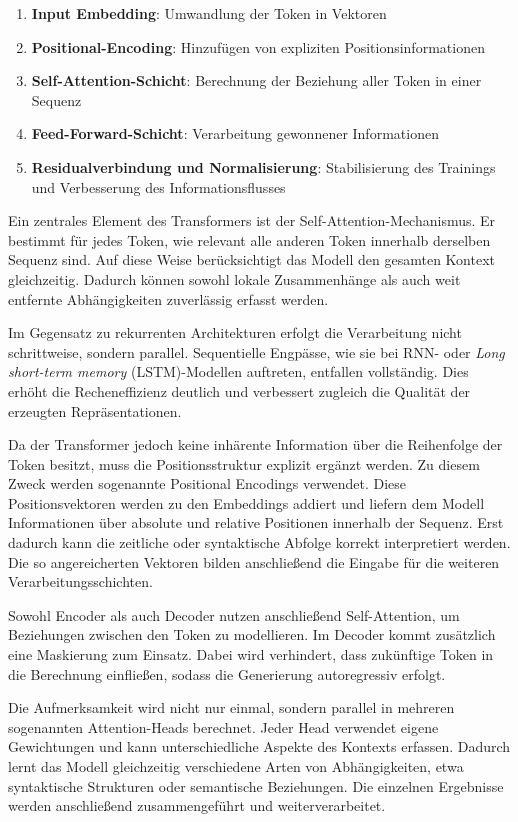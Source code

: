 \begin{enumerate}
    \item \textbf{Input Embedding}: Umwandlung der Token in Vektoren
    \item \textbf{Positional-Encoding}: Hinzufügen von expliziten Positionsinformationen
    \item \textbf{Self-Attention-Schicht}: Berechnung der Beziehung aller Token in einer Sequenz
    \item \textbf{Feed-Forward-Schicht}: Verarbeitung gewonnener Informationen
    \item \textbf{Residualverbindung und Normalisierung}: Stabilisierung des Trainings und Verbesserung des Informationsflusses   
\end{enumerate}

Ein zentrales Element des Transformers ist der Self-Attention-Mechanismus. Er bestimmt für jedes Token, wie relevant alle anderen Token innerhalb derselben Sequenz sind. Auf diese Weise berücksichtigt das Modell den gesamten Kontext gleichzeitig. Dadurch können sowohl lokale Zusammenhänge als auch weit entfernte Abhängigkeiten zuverlässig erfasst werden.

Im Gegensatz zu rekurrenten Architekturen erfolgt die Verarbeitung nicht schrittweise, sondern parallel. Sequentielle Engpässe, wie sie bei RNN- oder \textit{Long short-term memory} (LSTM)-Modellen  auftreten, entfallen vollständig. Dies erhöht die Recheneffizienz deutlich und verbessert zugleich die Qualität der erzeugten Repräsentationen.

Da der Transformer jedoch keine inhärente Information über die Reihenfolge der Token besitzt, muss die Positionsstruktur explizit ergänzt werden. Zu diesem Zweck werden sogenannte Positional Encodings verwendet. Diese Positionsvektoren werden zu den Embeddings addiert und liefern dem Modell Informationen über absolute und relative Positionen innerhalb der Sequenz. Erst dadurch kann die zeitliche oder syntaktische Abfolge korrekt interpretiert werden. Die so angereicherten Vektoren bilden anschließend die Eingabe für die weiteren Verarbeitungsschichten.

Sowohl Encoder als auch Decoder nutzen anschließend Self-Attention, um Beziehungen zwischen den Token zu modellieren. Im Decoder kommt zusätzlich eine Maskierung zum Einsatz. Dabei wird verhindert, dass zukünftige Token in die Berechnung einfließen, sodass die Generierung autoregressiv erfolgt.

Die Aufmerksamkeit wird nicht nur einmal, sondern parallel in mehreren sogenannten Attention-Heads berechnet. Jeder Head verwendet eigene Gewichtungen und kann unterschiedliche Aspekte des Kontexts erfassen. Dadurch lernt das Modell gleichzeitig verschiedene Arten von Abhängigkeiten, etwa syntaktische Strukturen oder semantische Beziehungen. Die einzelnen Ergebnisse werden anschließend zusammengeführt und weiterverarbeitet.

